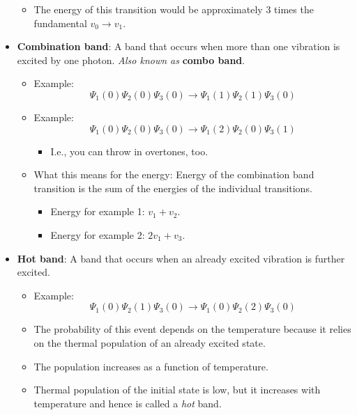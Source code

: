 \documentclass[../notes.tex]{subfiles}
\begin{document}
\begin{itemize}
\begin{itemize}
        \item The energy of this transition would be approximately 3 times the fundamental $v_0\to v_1$.
    \end{itemize}
    \item \textbf{Combination band}: A band that occurs when more than one vibration is excited by one photon. \emph{Also known as} \textbf{combo band}.
    \begin{itemize}
        \item Example:
        \begin{equation*}
            \Psi_1(0)\Psi_2(0)\Psi_3(0) \to \Psi_1(1)\Psi_2(1)\Psi_3(0)
        \end{equation*}
        \item Example:
        \begin{equation*}
            \Psi_1(0)\Psi_2(0)\Psi_3(0) \to \Psi_1(2)\Psi_2(0)\Psi_3(1)
        \end{equation*}
        \begin{itemize}
            \item I.e., you can throw in overtones, too.
        \end{itemize}
        \item What this means for the energy: Energy of the combination band transition is the sum of the energies of the individual transitions.
        \begin{itemize}
            \item Energy for example 1: $v_1+v_2$.
            \item Energy for example 2: $2v_1+v_3$.
        \end{itemize}
    \end{itemize}
    \item \textbf{Hot band}: A band that occurs when an already excited vibration is further excited.
    \begin{itemize}
        \item Example:
        \begin{equation*}
            \Psi_1(0)\Psi_2(1)\Psi_3(0) \to \Psi_1(0)\Psi_2(2)\Psi_3(0)
        \end{equation*}
        \item The probability of this event depends on the temperature because it relies on the thermal population of an already excited state.
        \item The population increases as a function of temperature.
        \item Thermal population of the initial state is low, but it increases with temperature and hence is called a \emph{hot} band.

\end{itemize}
\end{itemize}
\end{document}
